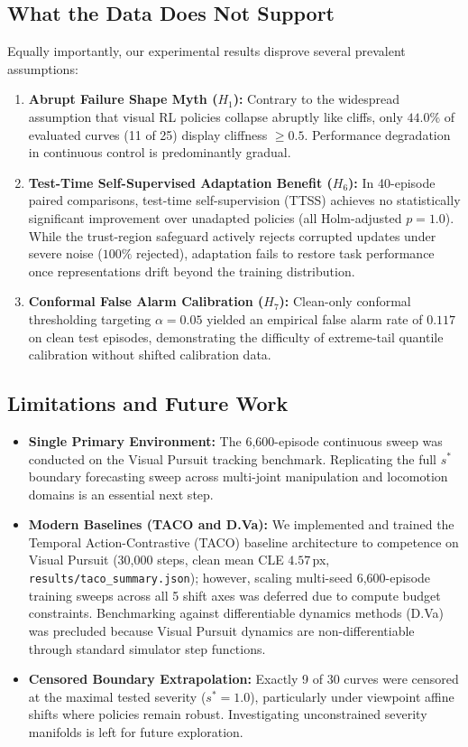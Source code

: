 \subsection{What the Data Does Not Support}
Equally importantly, our experimental results disprove several prevalent assumptions:
\begin{enumerate}
    \item \textbf{Abrupt Failure Shape Myth ($H_1$):} Contrary to the widespread assumption that visual RL policies collapse abruptly like cliffs, only $44.0\%$ of evaluated curves (11 of 25) display cliffness $\ge 0.5$. Performance degradation in continuous control is predominantly gradual.
    \item \textbf{Test-Time Self-Supervised Adaptation Benefit ($H_6$):} In 40-episode paired comparisons, test-time self-supervision (TTSS) achieves no statistically significant improvement over unadapted policies (all Holm-adjusted $p = 1.0$). While the trust-region safeguard actively rejects corrupted updates under severe noise ($100\%$ rejected), adaptation fails to restore task performance once representations drift beyond the training distribution.
    \item \textbf{Conformal False Alarm Calibration ($H_7$):} Clean-only conformal thresholding targeting $\alpha = 0.05$ yielded an empirical false alarm rate of $0.117$ on clean test episodes, demonstrating the difficulty of extreme-tail quantile calibration without shifted calibration data.
\end{enumerate}

\subsection{Limitations and Future Work}
\begin{itemize}
    \item \textbf{Single Primary Environment:} The 6,600-episode continuous sweep was conducted on the Visual Pursuit tracking benchmark. Replicating the full $s^*$ boundary forecasting sweep across multi-joint manipulation and locomotion domains is an essential next step.
    \item \textbf{Modern Baselines (TACO and D.Va):} We implemented and trained the Temporal Action-Contrastive (TACO) baseline architecture to competence on Visual Pursuit (30,000 steps, clean mean CLE $4.57$\,px, \texttt{results/taco\_summary.json}); however, scaling multi-seed 6,600-episode training sweeps across all 5 shift axes was deferred due to compute budget constraints. Benchmarking against differentiable dynamics methods (D.Va) was precluded because Visual Pursuit dynamics are non-differentiable through standard simulator step functions.
    \item \textbf{Censored Boundary Extrapolation:} Exactly 9 of 30 curves were censored at the maximal tested severity ($s^* = 1.0$), particularly under viewpoint affine shifts where policies remain robust. Investigating unconstrained severity manifolds is left for future exploration.
\end{itemize}
